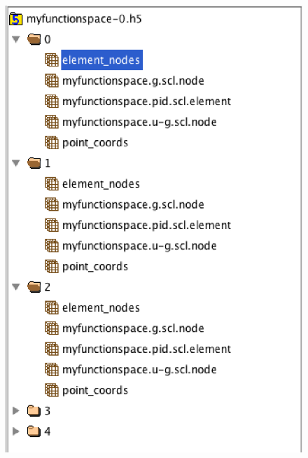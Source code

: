 \documentclass{beamer}
\begin{document}
\begin{frame}
\begin{figure}
\includegraphics [scale=0.40] {HDFview5.png}
\end{figure}
\end{frame}
\end{document}
